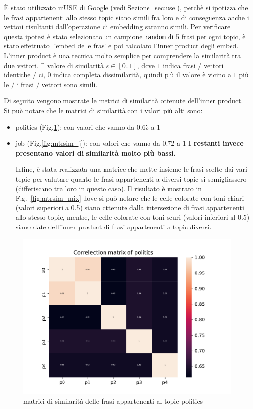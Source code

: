 
È stato utilizzato mUSE di Google (vedi Sezione~\ref{sec:use}), perchè si ipotizza che le frasi appartenenti allo stesso topic siano simili fra loro e di conseguenza anche i vettori risultanti dall'operazione di embedding saranno simili. Per verificare questa ipotesi è stato selezionato un campione {\tt random} di 5 frasi per ogni topic, è stato effettuato l'embed delle frasi e poi calcolato l'inner product degli embed. L'inner product è una tecnica molto semplice per comprendere la similarità tra due vettori. Il valore di similarità $s \in [0..1]$, dove $1$ indica frasi / vettori identiche / ci, $0$ indica completa dissimilarità, quindi più il valore è vicino a $1$ più le / i frasi / vettori sono simili.

Di seguito vengono mostrate le metrici di similarità ottenute dell'inner product. Si può notare che le matrici di similarità con i valori più alti sono:
\begin{itemize}
    \item politics (Fig.\ref{fig:mtrsim_p}): con valori che vanno da 0.63 a 1
    \item job (Fig.\ref{fig:mtrsim_j}): con valori che vanno da 0.72 a 1
\textbf{I restanti invece presentano valori di similarità molto più bassi.}

Infine, è stata realizzata una matrice che mette insieme le frasi scelte dai vari topic per valutare quanto le frasi appartenenti a diversi topic si somigliassero (differiscano tra loro in questo caso). Il risultato è mostrato in Fig.~\ref{fig:mtrsim_mix} dove si può notare che le celle colorate con toni chiari (valori superiori a 0.5) siano ottenute dalla intersezione di frasi appartenenti allo stesso topic, mentre, le celle colorate con toni scuri (valori inferiori al 0.5) siano date dell'inner product di frasi appartenenti a topic diversi.
\end{itemize}
\begin{figure}[h!t]
    \centering
    \includegraphics{Figure/simMatr/politics.pdf}
    \caption{matrici di similarità delle frasi appartenenti al topic politics}
    \label{fig:mtrsim_p}
\end{figure}
\FloatBarrier

